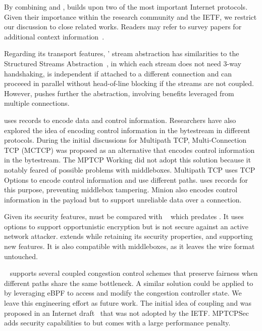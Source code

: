 
By combining \tcp and \tls, \tcpls builds upon two of the most important
Internet protocols. Given their importance within 
the research community and the IETF, we restrict our discussion to close
related works. Readers may refer to survey papers for additional 
context 
information~\cite{polese2019survey,li2016multipath,papastergiou2016ossifying}.

Regarding its transport features, \tcpls' stream abstraction has similarities to
the Structured Streams Abstraction~\cite{ford2007structured}, in which each
stream does not need 3-way handshaking, is independent if attached to a
different \tcp connection and can proceeed in parallel without head-of-line
blocking if the streams are not coupled. However, \tcpls pushes further the
abstraction, involving benefits leveraged from multiple connections.

\tcpls uses \tls records to encode data and control information. Researchers
have also explored the idea of encoding control information in the bytestream in
different protocols. During the initial discussions for Multipath TCP,
Multi-Connection TCP (MCTCP) \cite{draft-scharf-mptcp-mctcp-01}
was proposed as an alternative that encodes control information in the bytestream.
The MPTCP Working did not adopt this solution because it notably feared of
possible problems with middleboxes. Multipath TCP \cite{raiciu2012hard,rfc6824}
uses TCP Options to encode control information and use different paths. \tcpls
uses \tls records for this purpose, preventing middlebox tampering.
Minion \cite{nowlan2012fitting} also encodes control information in the \tcp
payload but to support unreliable data over a connection.


Given its security features, \tcpls must be compared with 
\tcpcrypt~\cite{bittau2010case,rfc8548} which predates . It uses \tcp 
options to support opportunistic encryption but is not secure against an active 
network attacker. \tcpls extends \tls while retaining its security 
properties, and supporting new features. It is also compatible with \tcp 
middleboxes, as it leaves the \tcp wire format untouched.

\mptcp~\cite{raiciu2012hard,rfc6824} supports several coupled congestion 
control schemes
\cite{peng2014multipath,wischik2011design,khalili2013mptcp} that preserve
fairness when different paths share the same bottleneck. A similar solution 
could be applied to \tcpls by leveraging eBPF to access and modify the 
congestion controller state. We leave this engineering effort as future work.
The initial idea of coupling \mptcp and \tls was proposed in an
Internet draft~\cite{draft-paasch-mptcp-ssl-00} that was not adopted by the
IETF. MPTCPSec~\cite{jadin2017securing} adds security capabilities to \mptcp but
comes with a large performance penalty.


